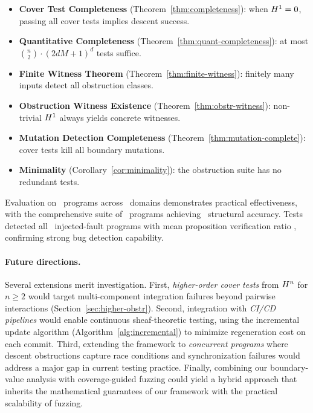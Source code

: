 \documentclass[11pt]{article}
\begin{document}
\begin{itemize}[noitemsep]
  \item \textbf{Cover Test Completeness} (Theorem~\ref{thm:completeness}):
    when $H^{1} = 0$, passing all cover tests implies descent success.
  \item \textbf{Quantitative Completeness}
    (Theorem~\ref{thm:quant-completeness}): at most
    $\binom{n}{2} \cdot (2dM+1)^d$ tests suffice.
  \item \textbf{Finite Witness Theorem} (Theorem~\ref{thm:finite-witness}):
    finitely many inputs detect all obstruction classes.
  \item \textbf{Obstruction Witness Existence}
    (Theorem~\ref{thm:obstr-witness}): non-trivial $H^{1}$ always
    yields concrete witnesses.
  \item \textbf{Mutation Detection Completeness}
    (Theorem~\ref{thm:mutation-complete}): cover tests kill all
    boundary mutations.
  \item \textbf{Minimality} (Corollary~\ref{cor:minimality}): the
    obstruction suite has no redundant tests.
\end{itemize}

Evaluation on \expTotalPrograms\ programs across \expDomainCount\ domains
demonstrates practical effectiveness, with the comprehensive suite of
\compTotalPrograms\ programs achieving \compOverallAccuracy\ structural
accuracy.  Tests detected all \compBuggyCount\ injected-fault programs
with mean proposition verification ratio \compBuggyMeanPropRatio,
confirming strong bug detection capability.

\paragraph{Future directions.}
Several extensions merit investigation.  First, \emph{higher-order cover
tests} from $H^{n}$ for $n \geq 2$ would target multi-component
integration failures beyond pairwise interactions
(Section~\ref{sec:higher-obstr}).  Second, integration with \emph{CI/CD
pipelines} would enable continuous sheaf-theoretic testing, using the
incremental update algorithm (Algorithm~\ref{alg:incremental}) to
minimize regeneration cost on each commit.  Third, extending the
framework to \emph{concurrent programs} where descent obstructions
capture race conditions and synchronization failures would address a
major gap in current testing practice.  Finally, combining our
boundary-value analysis with coverage-guided fuzzing could yield a
hybrid approach that inherits the mathematical guarantees of our
framework with the practical scalability of fuzzing.
\end{document}
